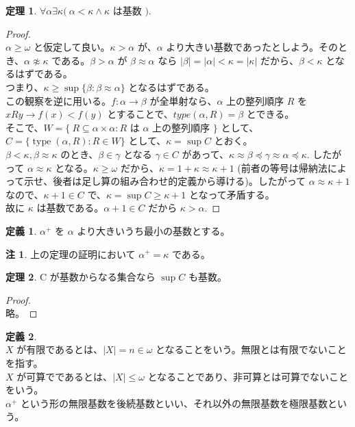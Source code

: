 \documentclass{jsarticle}
\theoremstyle{definition}
\newtheorem*{definition*}{定義}
\newtheorem{theorem}{定理}[section]
\newtheorem{remark}{注}[section]
\begin{document}
    \begin{theorem}
        $\forall \alpha \exists \kappa (\ \alpha < \kappa \land \kappa$ は基数 $).$
    \end{theorem}
    \begin{proof} \ \\
        $\alpha\geq\omega$ と仮定して良い。$\kappa > \alpha$ が、$\alpha$ より大きい基数であったとしよう。そのとき、$\alpha \not\approx \kappa$ である。$\beta > \alpha$ が $\beta \approx \alpha$ なら $|\beta| = |\alpha| < \kappa = |\kappa|$ だから、$\beta < \kappa$ となるはずである。\\
        つまり、$\kappa \geq \sup \{\beta : \beta \approx \alpha\}$ となるはずである。\\
        この観察を逆に用いる。$f : \alpha \rightarrow \beta$ が全単射なら、$\alpha$ 上の整列順序 $R$ を $xRy \rightarrow f(x) < f(y)$ とすることで、$type(\alpha, R) = \beta$ とできる。\\
        そこで、$W = \{\ R \subseteq \alpha \times \alpha : R$ は $\alpha$ 上の整列順序 $\}$ として、$C = \{\operatorname{type}(\alpha, R) : R \in W\}$ として、$\kappa = \sup C$ とおく。\\
        $\beta < \kappa, \beta \approx \kappa$ のとき、$\beta \in \gamma$ となる $\gamma \in C$ があって、$\kappa \approx \beta \preceq \gamma \approx \alpha \preceq \kappa.$ したがって $\alpha \approx \kappa$ となる。$\kappa \geq \omega$ だから、$\kappa = 1 + \kappa \approx \kappa + 1$ (前者の等号は帰納法によって示せ、後者は足し算の組み合わせ的定義から導ける)。したがって $\alpha \approx \kappa+1$ なので、$\kappa+1 \in C$ で、$\kappa = \sup C \geq \kappa + 1$ となって矛盾する。\\
        故に $\kappa$ は基数である。$\alpha + 1 \in C$ だから $\kappa > \alpha.$
    \end{proof}
    \begin{definition*}
        $\alpha^+$ を $\alpha$ より大きいうち最小の基数とする。
    \end{definition*}
    \begin{remark}
        上の定理の証明において $\alpha^+ = \kappa$ である。
    \end{remark}
    \vspace{1ex}
    \begin{theorem}
        C が基数からなる集合なら $\sup C$ も基数。
    \end{theorem}
    \begin{proof} \ \\
        略。
    \end{proof}
    \begin{definition*} \ \\
        $X$ が有限であるとは、$|X| = n \in \omega$ となることをいう。無限とは有限でないことを指す。\\
        $X$ が可算でであるとは、$|X| \leq \omega$ となることであり、非可算とは可算でないことをいう。\\
        $\alpha^+$ という形の無限基数を後続基数といい、それ以外の無限基数を極限基数という。
    \end{definition*}
\end{document}
